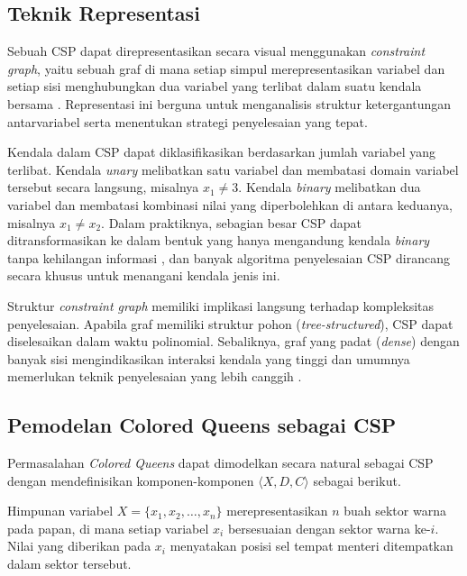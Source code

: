 \subsection{Teknik Representasi}
\label{subsec:csp-representasi}

Sebuah CSP dapat direpresentasikan secara visual menggunakan \textit{constraint graph}, yaitu sebuah graf di mana setiap simpul merepresentasikan variabel dan setiap sisi menghubungkan dua variabel yang terlibat dalam suatu kendala bersama \cite{russell2020artificial}. Representasi ini berguna untuk menganalisis struktur ketergantungan antarvariabel serta menentukan strategi penyelesaian yang tepat.

Kendala dalam CSP dapat diklasifikasikan berdasarkan jumlah variabel yang terlibat. Kendala \textit{unary} melibatkan satu variabel dan membatasi domain variabel tersebut secara langsung, misalnya $x_1 \neq 3$. Kendala \textit{binary} melibatkan dua variabel dan membatasi kombinasi nilai yang diperbolehkan di antara keduanya, misalnya $x_1 \neq x_2$. Dalam praktiknya, sebagian besar CSP dapat ditransformasikan ke dalam bentuk yang hanya mengandung kendala \textit{binary} tanpa kehilangan informasi \cite{russell2020artificial}, dan banyak algoritma penyelesaian CSP dirancang secara khusus untuk menangani kendala jenis ini.

Struktur \textit{constraint graph} memiliki implikasi langsung terhadap kompleksitas penyelesaian. Apabila graf memiliki struktur pohon (\textit{tree-structured}), CSP dapat diselesaikan dalam waktu polinomial. Sebaliknya, graf yang padat (\textit{dense}) dengan banyak sisi mengindikasikan interaksi kendala yang tinggi dan umumnya memerlukan teknik penyelesaian yang lebih canggih \cite{russell2020artificial}.

\subsection{Pemodelan Colored Queens sebagai CSP}
\label{subsec:csp-colored-queens}

Permasalahan \textit{Colored Queens} dapat dimodelkan secara natural sebagai CSP dengan mendefinisikan komponen-komponen $\langle X, D, C \rangle$ sebagai berikut.

Himpunan variabel $X = \{x_1, x_2, \dots, x_n\}$ merepresentasikan $n$ buah sektor warna pada papan, di mana setiap variabel $x_i$ bersesuaian dengan sektor warna ke-$i$. Nilai yang diberikan pada $x_i$ menyatakan posisi sel tempat menteri ditempatkan dalam sektor tersebut.

